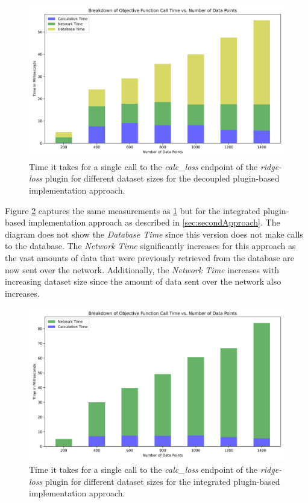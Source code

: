 \documentclass[
  a4paper,  %
  twoside,  %
  bibliography=totoc,
  headsepline,
  cleardoublepage=empty,
  parskip=half,
  draft=false
]{scrbook}
\begin{document}
\begin{figure}
  \centering
  \includegraphics[width=\textwidth]{graphics/of_call_times_version1.png}
  \caption[Call time for \emph{calc\_loss} endpoint decoupled approach]{Time it takes for a single call to the \emph{calc\_loss} endpoint of the \emph{ridge-loss} plugin for different dataset sizes for the decoupled plugin-based implementation approach.}
  \label{fig:of_call_time_version1}
\end{figure}

Figure \ref{fig:of_call_time_version2} captures the same measurements as \ref{fig:of_call_time_version1} but for the integrated plugin-based implementation approach as described in \ref{sec:secondApproach}.
The diagram does not show the \emph{Database Time} since this version does not make calls to the database.
The \emph{Network Time} significantly increases for this approach as the vast amounts of data that were previously retrieved from the database are now sent over the network.
Additionally, the \emph{Network Time} increases with increasing dataset size since the amount of data sent over the network also increases.

\begin{figure}
  \centering
  \includegraphics[width=\textwidth]{graphics/of_call_times_version2.png}
  \caption[Call time for \emph{calc\_loss} endpoint integrated approach]{Time it takes for a single call to the \emph{calc\_loss} endpoint of the \emph{ridge-loss} plugin for different dataset sizes for the integrated plugin-based implementation approach.}
  \label{fig:of_call_time_version2}
\end{figure}
\end{document}
